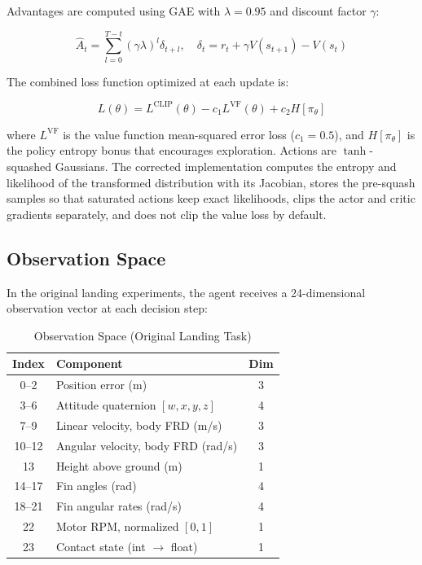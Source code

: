 \documentclass[conference]{IEEEtran}
\begin{document}
Advantages are computed using GAE with $\lambda = 0.95$ and discount factor $\gamma$:

\begin{equation}
\hat{A}_t = \sum_{l=0}^{T-t} (\gamma \lambda)^l \delta_{t+l}, \quad \delta_t = r_t + \gamma V(s_{t+1}) - V(s_t)
\label{eq:gae}
\end{equation}

The combined loss function optimized at each update is:

\begin{equation}
L(\theta) = L^{\text{CLIP}}(\theta) - c_1 L^{\text{VF}}(\theta) + c_2 H[\pi_\theta]
\label{eq:total_loss}
\end{equation}

\noindent where $L^{\text{VF}}$ is the value function mean-squared error loss ($c_1 = 0.5$), and $H[\pi_\theta]$ is the policy entropy bonus that encourages exploration. Actions are $\tanh$-squashed Gaussians. The corrected implementation computes the entropy and likelihood of the transformed distribution with its Jacobian, stores the pre-squash samples so that saturated actions keep exact likelihoods, clips the actor and critic gradients separately, and does not clip the value loss by default.

\subsection{Observation Space}

In the original landing experiments, the agent receives a 24-dimensional observation vector at each decision step:

\begin{table}[htbp]
\caption{Observation Space (Original Landing Task)}
\label{tab:obs_space}
\centering
\begin{tabular}{clc}
\toprule
\textbf{Index} & \textbf{Component} & \textbf{Dim} \\
\midrule
0--2 & Position error (m) & 3 \\
3--6 & Attitude quaternion $[w,x,y,z]$ & 4 \\
7--9 & Linear velocity, body FRD (m/s) & 3 \\
10--12 & Angular velocity, body FRD (rad/s) & 3 \\
13 & Height above ground (m) & 1 \\
14--17 & Fin angles (rad) & 4 \\
18--21 & Fin angular rates (rad/s) & 4 \\
22 & Motor RPM, normalized $[0,1]$ & 1 \\
23 & Contact state (int $\to$ float) & 1 \\
\bottomrule
\end{tabular}
\end{table}
\end{document}
